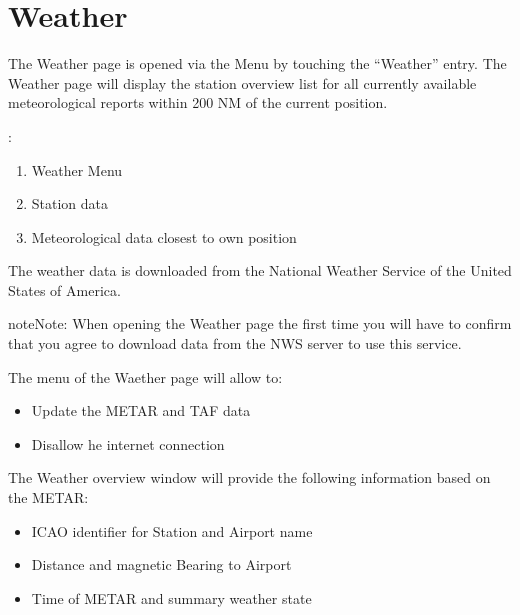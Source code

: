 \documentclass[letterpaper,10pt,english]{sphinxmanual}
\begin{document}
\chapter{Weather}
\label{\detokenize{03-reference/weather:weather}}\label{\detokenize{03-reference/weather::doc}}
\sphinxAtStartPar
The Weather page is opened via the Menu by touching the “Weather” entry.
The Weather page will display the station overview list for all currently available meteorological reports within 200 NM of the current position.

\begin{figure}[htbp]
\centering

\noindent{}
\end{figure}

\sphinxAtStartPar
{}:
\begin{enumerate}
%
\item {} 
\sphinxAtStartPar
Weather Menu

\item {} 
\sphinxAtStartPar
Station data

\item {} 
\sphinxAtStartPar
Meteorological data closest to own position

\end{enumerate}

\sphinxAtStartPar
The weather data is downloaded from the National Weather Service of the United States of America.

\begin{sphinxadmonition}{note}{Note:}
\sphinxAtStartPar
When opening the Weather page the first time you will have to confirm that you agree to download data from the NWS server to use this service.
\end{sphinxadmonition}

\sphinxAtStartPar
The menu of the Waether page will allow to:
\begin{itemize}
\item {} 
\sphinxAtStartPar
Update the METAR and TAF data

\item {} 
\sphinxAtStartPar
Disallow he internet connection

\end{itemize}

\sphinxAtStartPar
The Weather overview window will provide the following information based on the METAR:
\begin{itemize}
\item {} 
\sphinxAtStartPar
ICAO identifier for Station and Airport name

\item {} 
\sphinxAtStartPar
Distance and magnetic Bearing to Airport

\item {} 
\sphinxAtStartPar
Time of METAR and summary weather state

\end{itemize}
\end{document}
